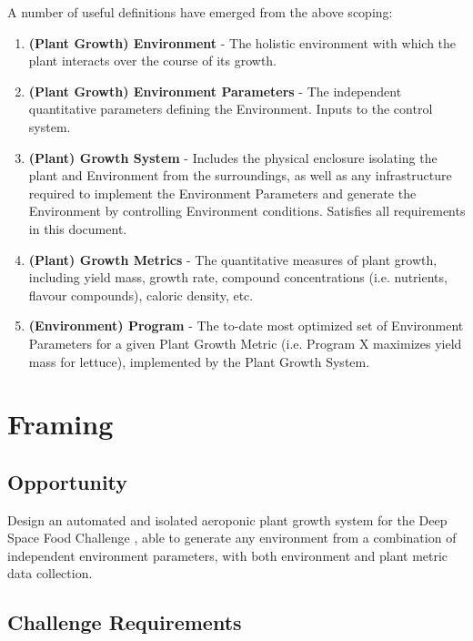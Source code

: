 \documentclass{report}
\begin{document}
A number of useful definitions have emerged from the above scoping:
\begin{enumerate}
\item \textbf{(Plant Growth) Environment} - The holistic environment with which the plant interacts over the course of its growth.
\item \textbf{(Plant Growth) Environment Parameters} - The independent quantitative parameters defining the Environment. Inputs to the control system.
\item \textbf{(Plant) Growth System} - Includes the physical enclosure isolating the plant and Environment from the surroundings, as well as any infrastructure required to implement the Environment Parameters and generate the Environment by controlling Environment conditions. Satisfies all requirements in this document.
\item \textbf{(Plant) Growth Metrics} - The quantitative measures of plant growth, including yield mass, growth rate, compound concentrations (i.e. nutrients, flavour compounds), caloric density, etc.
\item \textbf{(Environment) Program} - The to-date most optimized set of Environment Parameters for a given Plant Growth Metric (i.e. Program X maximizes yield mass for lettuce), implemented by the Plant Growth System.
\end{enumerate}

\newpage
\section{Framing}
\label{sec:framing}

\subsection{Opportunity}
\label{sec:opportunity}

Design an automated and isolated aeroponic plant growth system for the Deep Space Food Challenge \cite{dsfc}, able to generate any environment from a combination of independent environment parameters, with both environment and plant metric data collection.

\subsection{Challenge Requirements}
\label{sec:requirements}
\end{document}

